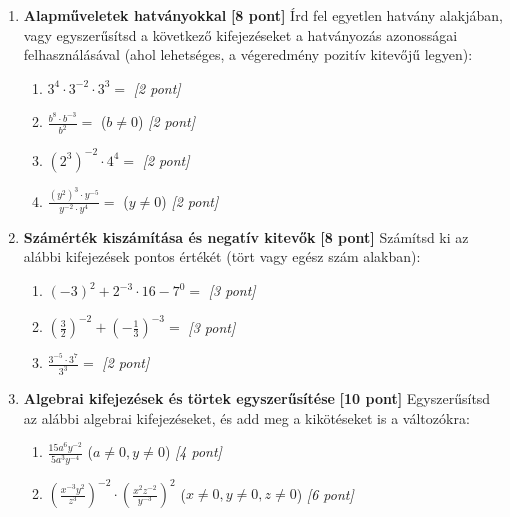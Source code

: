 \documentclass[11pt,a4paper]{article}
\begin{document}
\begin{enumerate}
    \item \textbf{Alapműveletek hatványokkal} \hfill \textbf{[8 pont]}
    Írd fel egyetlen hatvány alakjában, vagy egyszerűsítsd a következő kifejezéseket a hatványozás azonosságai felhasználásával (ahol lehetséges, a végeredmény pozitív kitevőjű legyen):
    \begin{enumerate}
        \item $3^4 \cdot 3^{-2} \cdot 3^3 =$ \hfill \textit{[2 pont]}
        \item $\frac{b^8 \cdot b^{-3}}{b^2} =$ \quad ($b \neq 0$) \hfill \textit{[2 pont]}
        \item $(2^3)^{-2} \cdot 4^4 =$ \hfill \textit{[2 pont]}
        \item $\frac{(y^2)^3 \cdot y^{-5}}{y^{-2} \cdot y^4} =$ \quad ($y \neq 0$) \hfill \textit{[2 pont]}
    \end{enumerate}

    \vspace{2mm}
    \item \textbf{Számérték kiszámítása és negatív kitevők} \hfill \textbf{[8 pont]}
    Számítsd ki az alábbi kifejezések pontos értékét (tört vagy egész szám alakban):
    \begin{enumerate}
        \item $(-3)^2 + 2^{-3} \cdot 16 - 7^0 =$ \hfill \textit{[3 pont]}
        \item $\left(\frac{3}{2}\right)^{-2} + \left(-\frac{1}{3}\right)^{-3} =$ \hfill \textit{[3 pont]}
        \item $\frac{3^{-5} \cdot 3^7}{3^3} =$ \hfill \textit{[2 pont]}
    \end{enumerate}

    \vspace{2mm}
    \item \textbf{Algebrai kifejezések és törtek egyszerűsítése} \hfill \textbf{[10 pont]}
    Egyszerűsítsd az alábbi algebrai kifejezéseket, és add meg a kikötéseket is a változókra:
    \begin{enumerate}
        \item $\frac{15a^6 y^{-2}}{5a^3 y^{-4}}$ \quad ($a \neq 0, y \neq 0$) \hfill \textit{[4 pont]}
        \item $\left( \frac{x^{-3} y^2}{z^3} \right)^{-2} \cdot \left( \frac{x^2 z^{-2}}{y^{-3}} \right)^2$ \quad ($x \neq 0, y \neq 0, z \neq 0$) \hfill \textit{[6 pont]}
    \end{enumerate}


\end{enumerate}
\end{document}
